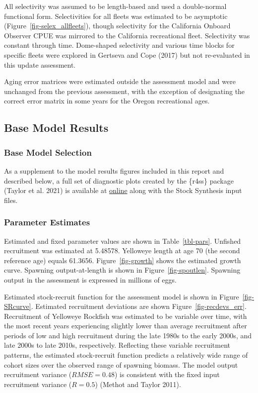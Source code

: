 \documentclass[
]{scrartcl}
\begin{document}
All selectivity was assumed to be length-based and used a double-normal
functional form. Selectivities for all fleets was estimated to be
asymptotic (Figure~\ref{fig-selex_allfleets}), though selectivity for
the California Onboard Observer CPUE was mirrored to the California
recreational fleet. Selectivity was constant through time. Dome-shaped
selectivity and various time blocks for specific fleets were explored in
Gertseva and Cope (2017) but not re-evaluated in this update assessment.

Aging error matrices were estimated outside the assessment model and
were unchanged from the previous assessment, with the exception of
designating the correct error matrix in some years for the Oregon
recreational ages.

\subsection{Base Model Results}\label{base-model-results}

\subsubsection{Base Model Selection}\label{base-model-selection}

As a supplement to the model results figures included in this report and
described below, a full set of diagnostic plots created by the \{r4ss\}
package (Taylor et al. 2021) is available at
\href{https://github.com/rclairer/Sebastes_ruberrimus_2025}{online}
along with the Stock Synthesis input files.

\subsubsection{Parameter Estimates}\label{parameter-estimates}

Estimated and fixed parameter values are shown in Table~\ref{tbl-pars}.
Unfished recruitment was estimated at 5.48578. Yelloweye length at age
70 (the second reference age) equals 61.3656. Figure~\ref{fig-growth}
shows the estimated growth curve. Spawning output-at-length is shown in
Figure~\ref{fig-spoutlen}. Spawning output in the assessment is
expressed in millions of eggs.

Estimated stock-recruit function for the assessment model is shown in
Figure~\ref{fig-SRcurve}. Estimated recruitment deviations are shown
Figure~\ref{fig-recdevs_err}. Recruitment of Yelloweye Rockfish was
estimated to be variable over time, with the most recent years
experiencing slightly lower than average recruitment after periods of
low and high recruitment during the late 1980s to the early 2000s, and
late 2000s to late 2010s, respectively. Reflecting these variable
recruitment patterns, the estimated stock-recruit function predicts a
relatively wide range of cohort sizes over the observed range of
spawning biomass. The model output recruitment variance
(\(RMSE = 0.48\)) is consistent with the fixed input recruitment
variance (\(R = 0.5\)) (Methot and Taylor 2011).
\end{document}
